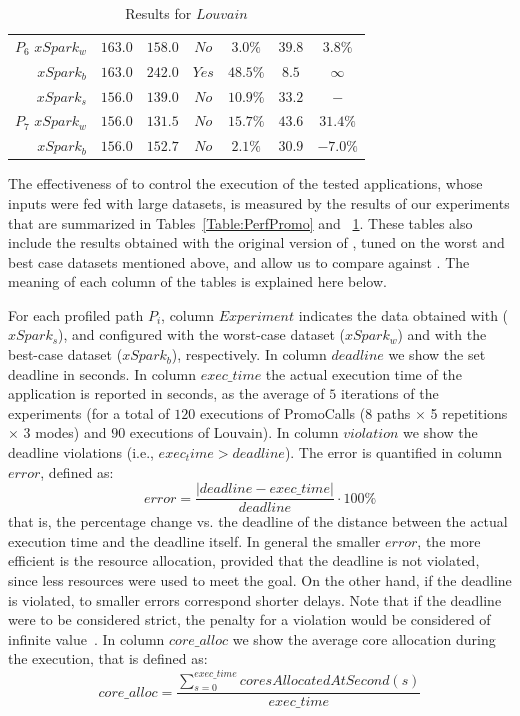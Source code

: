 \begin{table}[htbp]
\begin{tabular}{r|c|c|c|c|c|c}
		$P_6 \,\,xSpark_w$  & $163.0$   & $158.0$   & $No$   & $3.0\%$   & $39.8$   & $3.8\%$  \\
		$xSpark_b$  & $163.0$   & $242.0$   & $Yes$   & $48.5\%$   & $8.5$   & $\infty$  \\
		\midrule
		$xSpark_s$  & $156.0$   & $139.0$   & $No$   & $10.9\%$   & $33.2$   & $-$  \\
		$P_7 \,\,xSpark_w$  & $156.0$   & $131.5$   & $No$   & $15.7\%$   & $43.6$   & $31.4\%$  \\
		$xSpark_b$  & $156.0$   & $152.7$   & $No$   & $2.1\%$   & $30.9$   & $-7.0\%$  \\
		\bottomrule
	\end{tabular}
	\caption{Results for $Louvain$}
	\label{Table:Louvain}
	\vspace{-8mm}
\end{table}

The effectiveness of \tool to control the execution of the tested applications, whose inputs were fed with large datasets, is measured by the results of our experiments that are summarized in Tables~\ref{Table:PerfPromo} and ~\ref{Table:Louvain}. These tables also include the results obtained with the original version of \cSpark, tuned on the worst and best case datasets mentioned above, and allow us to compare \tool against \cSpark. The meaning of each column of the tables is explained here below.

For each profiled path $P_i$, column $Experiment$ indicates the data obtained with \tool ($xSpark_s$), and \cSpark configured with the worst-case dataset ($xSpark_w$) and with the best-case dataset ($xSpark_b$), respectively. 
In column $deadline$ we show the set deadline in seconds. 
In column $exec\_time$ the actual execution time of the application is reported in seconds, as the average of $5$ iterations of the experiments (for a total of $120$ executions of PromoCalls (8 paths $\times$ 5 repetitions $\times$ 3 modes) and $90$ executions of Louvain). 
In column $violation$ we show the deadline violations (i.e., $exec_time > deadline$). 
The error  is quantified in column $error$, defined as:
%
\[
error = \frac{|deadline - exec\_time|}{deadline}\cdot100\%
\]
%
that is, the percentage change vs. the deadline of the distance between the actual execution time and the deadline itself. In general the smaller $error$, the more efficient is the resource allocation, provided that the deadline is not violated, since less resources were used to meet the goal. On the other hand, if the deadline is violated, to smaller errors correspond shorter delays. Note that if the deadline were to be considered strict, the penalty for a violation would be considered of infinite value~\cite{shin1994real}.
In column $core\_alloc$ we show the average core allocation during the execution, that is defined as:
%
\[
core\_alloc = \frac{\sum_{s = 0}^{exec\_time} coresAllocatedAtSecond(s)}{exec\_time} 
\]
%

